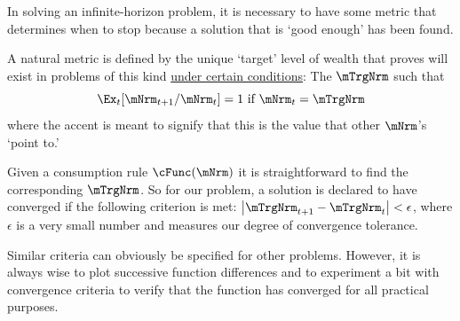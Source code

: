 \documentclass[titlepage, headings=optiontotocandhead]{\econtex}
\begin{document}
In solving an infinite-horizon problem, it is necessary to have some
metric that determines when to stop because a solution that is `good
enough' has been found.

A natural metric is defined by the unique `target' level of wealth that \cite{BufferStockTheory} proves
will exist in problems of this kind \href{https://llorracc.github.io/BufferStockTheory#GICNrm}{under certain conditions}: The $\mTrgNrm$ such that
\begin{equation}
  \Ex_t [{\mNrm}_{t+1}/\mNrm_t] = 1 \mbox{~if~} \mNrm_t = \mTrgNrm  \label{eq:mTrgNrmet}
\end{equation}
where the accent is meant to signify that this is the value
that other $\mNrm$'s `point to.'

Given a consumption rule $\cFunc(\mNrm)$ it is straightforward to find
the corresponding $\mTrgNrm$.  So for our problem, a solution is declared
to have converged if the following criterion is met:
$\left|\mTrgNrm_{t+1}-\mTrgNrm_{t}\right| < \epsilon$, where $\epsilon$ is
a very small number and measures our degree of convergence tolerance.

Similar criteria can obviously be specified for other problems.
However, it is always wise to plot successive function differences and
to experiment a bit with convergence criteria to verify that the
function has converged for all practical purposes.
\end{document}
